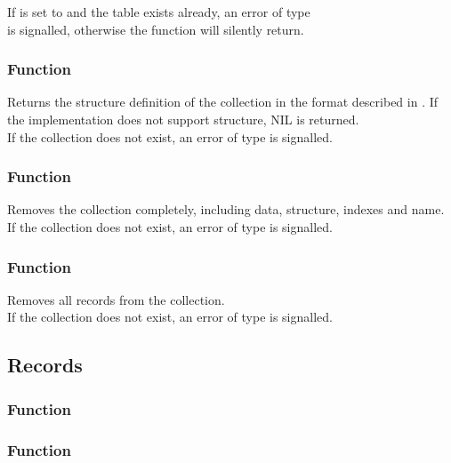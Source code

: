 \noindent If  is set to  and the table exists already, an error of type \\ is signalled, otherwise the function will silently return.

\subsubsection{Function }
Returns the structure definition of the collection in the format described in . If the implementation does not support structure, NIL is returned. \\

\noindent If the collection does not exist, an error of type  is signalled.

\subsubsection{Function }
Removes the collection completely, including data, structure, indexes and name. \\

\noindent If the collection does not exist, an error of type  is signalled.

\subsubsection{Function }
Removes all records from the collection. \\

\noindent If the collection does not exist, an error of type  is signalled.

\subsection{Records}

\subsubsection{Function }

\subsubsection{Function }

